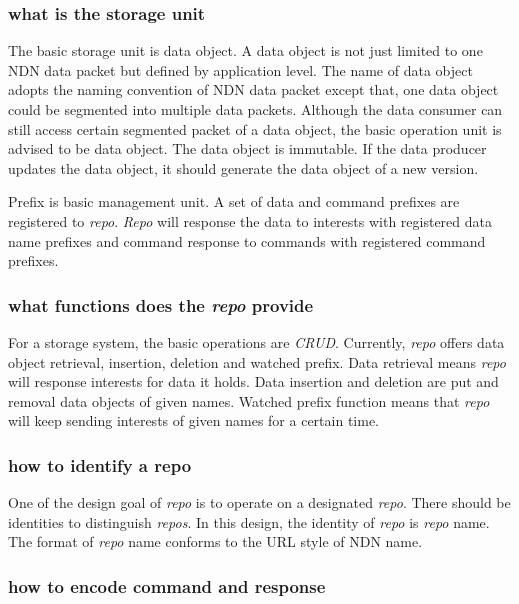\documentclass[conference]{IEEEtran}
\begin{document}
\subsubsection{what is the storage unit}

The basic storage unit is data object. A data object is not just limited to one NDN data packet but defined by application level. The name of data object adopts the naming convention of NDN data packet except that, one data object could be segmented into multiple data packets. Although the data consumer can still access certain segmented packet of a data object, the basic operation unit is advised to be data object. The data object is immutable. If the data producer updates the data object, it should generate the data object of a new version.

Prefix is basic management unit. A set of data and command prefixes are registered to \emph{repo}. \emph{Repo} will response the data to interests with registered data name prefixes and command response to commands with registered command prefixes.

\subsubsection{what functions does the \emph{repo} provide}

For a storage system, the basic operations are \emph{CRUD}. Currently, \emph{repo} offers data object retrieval, insertion, deletion and watched prefix. Data retrieval means \emph{repo} will response interests for data it holds. Data insertion and deletion are put and removal data objects of given names. Watched prefix function means that \emph{repo} will keep sending interests of given names for a certain time.

\subsubsection{how to identify a repo}

One of the design goal of \emph{repo} is to operate on a designated \emph{repo}. There should be identities to distinguish \emph{repos}. In this design, the identity of \emph{repo} is \emph{repo} name. The format of \emph{repo} name conforms to the URL style of NDN name.

\subsubsection{how to encode command and response}
\end{document}
